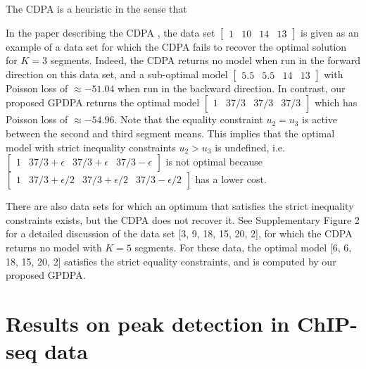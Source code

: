 \documentclass[aoas]{imsart}
\begin{document}
The CDPA is a heuristic in the sense that 

In the paper describing the CDPA \citep{HOCKING-PeakSeg}, the data set
$\left[\begin{array}{cccc} 1 & 10 & 14 & 13
\end{array}\right]$ is given as an example of a data set for which the CDPA fails to
recover the optimal solution for $K=3$ segments. Indeed, the CDPA
returns no model when run in the forward direction on this data set,
and a sub-optimal model
$\left[\begin{array}{cccc} 5.5 & 5.5 & 14 & 13 \end{array}\right]$
with Poisson loss of $\approx -51.04$ when run in the backward
direction. In contrast, our proposed GPDPA returns the optimal model
$\left[\begin{array}{cccc} 1 & 37/3 & 37/3 & 37/3 \end{array}\right]$
which has Poisson loss of $\approx -54.96$. Note that the equality
constraint $u_2=u_3$ is active between the second and third segment
means. This implies that the optimal model with strict inequality
constraints $u_2>u_3$ is undefined, i.e.
$\left[\begin{array}{cccc} 1 & 37/3 + \epsilon & 37/3 + \epsilon &
    37/3 - \epsilon \end{array}\right]$ is not optimal because
$\left[\begin{array}{cccc} 1 & 37/3 + \epsilon/2 & 37/3 + \epsilon/2 &
    37/3 - \epsilon/2 \end{array}\right]$ has a lower cost. 

There are also data sets for which an optimum that satisfies the
strict inequality constraints exists, but the CDPA does not recover
it. See Supplementary Figure 2 for a detailed discussion of the data
set [3, 9, 18, 15, 20, 2], for which the CDPA returns no model with
$K=5$ segments. For these data, the optimal model [6, 6, 18, 15, 20,
2] satisfies the strict equality constraints, and is computed by our
proposed GPDPA.

\section{Results on peak detection in ChIP-seq data}
\label{sec:results-chip-seq}
\label{sec:results}

\end{document}

